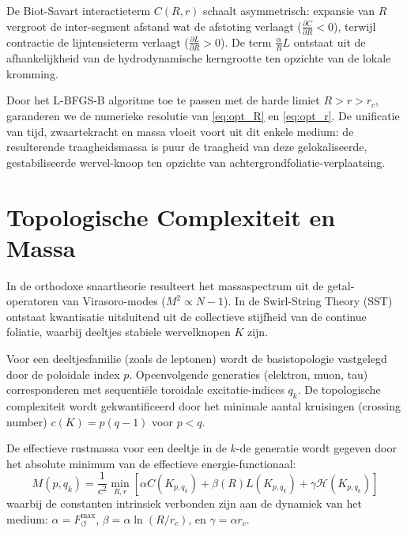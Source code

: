 \documentclass[12pt,a4paper]{article}
\begin{document}
                    De Biot-Savart interactieterm $C(R, r)$ schaalt asymmetrisch: expansie van $R$ vergroot de inter-segment afstand wat de afstoting verlaagt ($\frac{\partial C}{\partial R} < 0$), terwijl contractie de lijntensieterm verlaagt ($\frac{\partial L}{\partial R} > 0$). De term $\frac{\alpha}{R} L$ ontstaat uit de afhankelijkheid van de hydrodynamische kerngrootte ten opzichte van de lokale kromming.
                    
                    Door het L-BFGS-B algoritme toe te passen met de harde limiet $R > r > r_c$, garanderen we de numerieke resolutie van \eqref{eq:opt_R} en \eqref{eq:opt_r}. De unificatie van tijd, zwaartekracht en massa vloeit voort uit dit enkele medium: de resulterende traagheidsmassa is puur de traagheid van deze gelokaliseerde, gestabiliseerde wervel-knoop ten opzichte van achtergrondfoliatie-verplaatsing.
        

            
            \section{Topologische Complexiteit en Massa}
                
                In de orthodoxe snaartheorie resulteert het massaspectrum uit de getal-operatoren van Virasoro-modes ($M^2 \propto N-1$). In de Swirl-String Theory (SST) ontstaat kwantisatie uitsluitend uit de collectieve stijfheid van de continue foliatie, waarbij deeltjes stabiele wervelknopen $K$ zijn.
                
                Voor een deeltjesfamilie (zoals de leptonen) wordt de basistopologie vastgelegd door de poloidale index $p$. Opeenvolgende generaties (elektron, muon, tau) corresponderen met sequenti\"ele toroidale excitatie-indices $q_k$. De topologische complexiteit wordt gekwantificeerd door het minimale aantal kruisingen (crossing number) $c(K) = p(q-1)$ voor $p < q$.
                
                De effectieve rustmassa voor een deeltje in de $k$-de generatie wordt gegeven door het absolute minimum van de effectieve energie-functionaal:
                \begin{equation}
                    M(p, q_k) = \frac{1}{c^2} \min_{R, r} \left[ \alpha C(K_{p,q_k}) + \beta(R) L(K_{p,q_k}) + \gamma \mathcal{H}(K_{p,q_k}) \right]
                \end{equation}
                waarbij de constanten intrinsiek verbonden zijn aan de dynamiek van het medium: $\alpha = F_{\!\boldsymbol{\circlearrowleft}}^{\max}$, $\beta = \alpha \ln(R/r_c)$, en $\gamma = \alpha r_c$.
            
\end{document}
